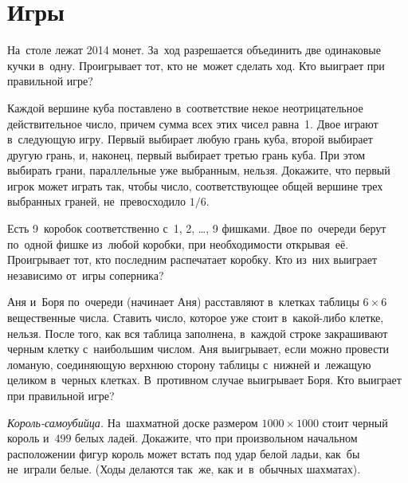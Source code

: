 

\section*{Игры}


\begin{problems}

\item
На~столе лежат 2014 монет.
За~ход разрешается объединить две одинаковые кучки в~одну.
Проигрывает тот, кто не~может сделать ход.
Кто выиграет при правильной игре?

\item
Каждой вершине куба поставлено в~соответствие некое неотрицательное
действительное число, причем сумма всех этих чисел равна~1.
Двое играют в~следующую игру.
Первый выбирает любую грань куба, второй выбирает другую грань, и, наконец,
первый выбирает третью грань куба.
При этом выбирать грани, параллельные уже выбранным, нельзя.
Докажите, что первый игрок может играть так, чтобы число, соответствующее общей
вершине трех выбранных граней, не~превосходило $1 / 6$.

\item
Есть 9~коробок соответственно с~1, 2, \ldots, 9 фишками.
Двое по~очереди берут по~одной фишке из~любой коробки, при необходимости
открывая~её.
Проигрывает тот, кто последним распечатает коробку.
Кто из~них выиграет независимо от~игры соперника?

\item
Аня и~Боря по~очереди (начинает Аня) расставляют в~клетках таблицы $6 \times 6$
вещественные числа.
Ставить число, которое уже стоит в~какой-либо клетке, нельзя.
После того, как вся таблица заполнена, в~каждой строке закрашивают черным
клетку с~наибольшим числом.
Аня выигрывает, если можно провести ломаную, соединяющую верхнюю сторону
таблицы с~нижней и~лежащую целиком в~черных клетках.
В~противном случае выигрывает Боря.
Кто выиграет при правильной игре?

\item\emph{Король-самоубийца.}
На~шахматной доске размером $1000 \times 1000$ стоит черный король
и~$499$ белых ладей.
Докажите, что при произвольном начальном расположении фигур король может встать
под удар белой ладьи, как~бы не~играли белые.
(Ходы делаются так~же, как и~в~обычных шахматах).


\end{problems}
